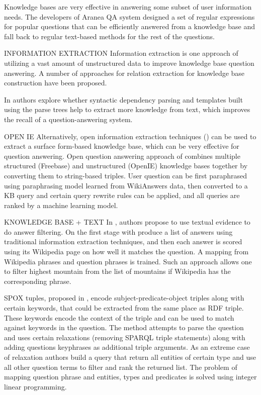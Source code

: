 Knowledge bases are very effective in answering some subset of user information needs.
The developers of Aranea QA system \cite{lin2003question} designed a set of regular expressions for popular questions that can be efficiently answered from a knowledge base and fall back to regular text-based methods for the rest of the questions.

INFORMATION EXTRACTION
Information extraction is one approach of utilizing a vast amount of unstructured data to improve knowledge base question answering.
A number of approaches for relation extraction for knowledge base construction have been proposed.

In \cite{jijkoun2004information} authors explore whether syntactic dependency parsing and templates built using the parse trees help to extract more knowledge from text, which improves the recall of a question-answering system.


OPEN IE
Alternatively, open information extraction techniques (\cite{Etzioni:2008:OIE:1409360.1409378}) can be used to extract a surface form-based knowledge base, which can be very effective for question answering.
Open question answering approach of \cite{Fader:2014:OQA:2623330.2623677} combines multiple structured (Freebase) and unstructured (OpenIE) knowledge bases together by converting them to string-based triples.
User question can be first paraphrased using paraphrasing model learned from WikiAnswers data, then converted to a KB query and certain query rewrite rules can be applied, and all queries are ranked by a machine learning model.

KNOWLEDGE BASE + TEXT
In \cite{xu2016enhancing}, authors propose to use textual evidence to do answer filtering.
On the first stage with produce a list of answers using traditional information extraction techniques, and then each answer is scored using its Wikipedia page on how well it matches the question. A mapping from Wikipedia phrases and question phrases is trained.
Such an approach allows one to filter highest mountain from the list of mountains if Wikipedia has the corresponding phrase.

SPOX tuples, proposed in \cite{yahya2013robust}, encode subject-predicate-object triples along with certain keywords, that could be extracted from the same place as RDF triple.
These keywords encode the context of the triple and can be used to match against keywords in the question. The method attempts to parse the question and uses certain relaxations (removing SPARQL triple statements) along with adding questions keyphrases as additional triple arguments.
As an extreme case of relaxation authors build a query that return all entities of certain type and use all other question terms to filter and rank the returned list.
The problem of mapping question phrase and entities, types and predicates is solved using integer linear programming.

